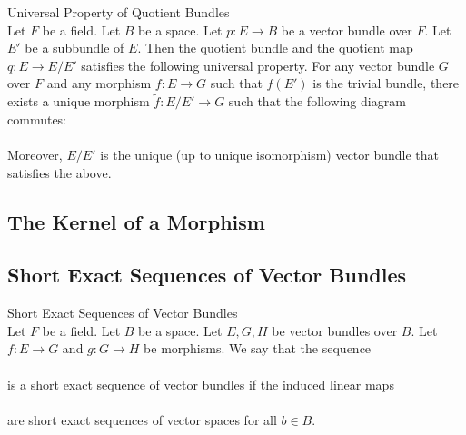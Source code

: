 \documentclass[a4paper]{article}
\begin{document}
\begin{prp}{Universal Property of Quotient Bundles}{}\\
Let $F$ be a field. Let $B$ be a space. Let $p:E\to B$ be a vector bundle over $F$. Let $E'$ be a subbundle of $E$. Then the quotient bundle and the quotient map $q:E\to E/E'$ satisfies the following universal property. For any vector bundle $G$ over $F$ and any morphism $f:E\to G$ such that $f(E')$ is the trivial bundle, there exists a unique morphism $\widetilde{f}:E/E'\to G$ such that the following diagram commutes: \\
\\
Moreover, $E/E'$ is the unique (up to unique isomorphism) vector bundle that satisfies the above. 
\end{prp}

\subsection{The Kernel of a Morphism}

\subsection{Short Exact Sequences of Vector Bundles}
\begin{defn}{Short Exact Sequences of Vector Bundles}{}\\
Let $F$ be a field. Let $B$ be a space. Let $E,G,H$ be vector bundles over $B$. Let $f:E\to G$ and $g:G\to H$ be morphisms. We say that the sequence \\
\\
is a short exact sequence of vector bundles if the induced linear maps \\
\\
are short exact sequences of vector spaces for all $b\in B$. 
\end{defn}
\end{document}
